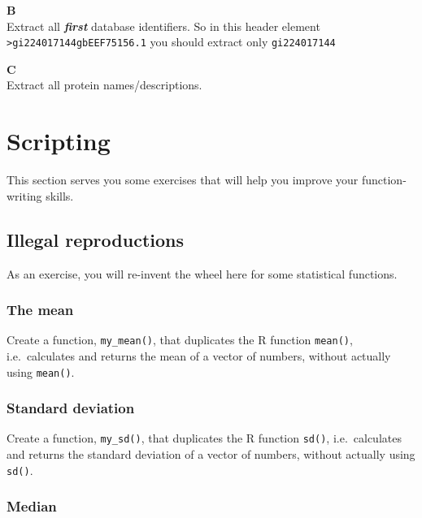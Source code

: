 \documentclass[]{book}
\begin{document}
\textbf{B}\\
Extract all \textbf{\emph{first}} database identifiers. So in this header element \texttt{\textgreater{}gi\textbar{}224017144\textbar{}gb\textbar{}EEF75156.1\textbar{}} you should extract only \texttt{gi\textbar{}224017144}

\textbf{C}\\
Extract all protein names/descriptions.

\hypertarget{scripting-2}{%
\section{Scripting}\label{scripting-2}}

This section serves you some exercises that will help you improve your function-writing skills.

\hypertarget{illegal-reproductions}{%
\subsection{Illegal reproductions}\label{illegal-reproductions}}

As an exercise, you will re-invent the wheel here for some statistical functions.

\hypertarget{the-mean}{%
\subsubsection*{The mean}\label{the-mean}}

Create a function, \texttt{my\_mean()}, that duplicates the R function \texttt{mean()}, i.e.~calculates and returns the mean of a vector of numbers, without actually using \texttt{mean()}.

\hypertarget{standard-deviation}{%
\subsubsection*{Standard deviation}\label{standard-deviation}}

Create a function, \texttt{my\_sd()}, that duplicates the R function \texttt{sd()}, i.e.~calculates and returns the standard deviation of a vector of numbers, without actually using \texttt{sd()}.

\hypertarget{median}{%
\subsubsection*{Median}\label{median}}
\end{document}
